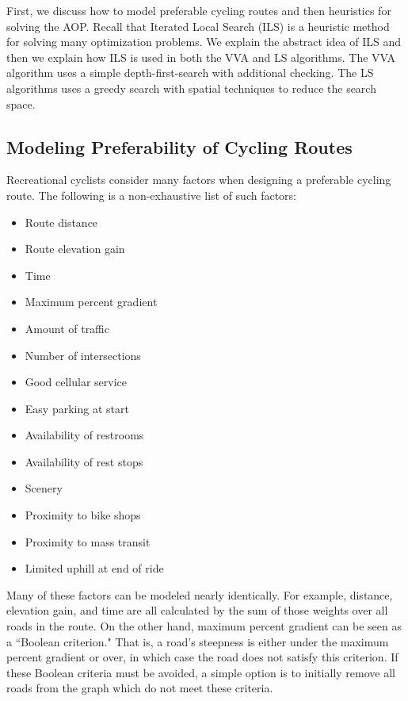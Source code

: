 \documentclass[honors]{union-cs-thesis}
\begin{document}
First, we discuss how to model preferable cycling routes and then heuristics for solving the AOP. Recall that Iterated Local Search (ILS) is a heuristic method for solving many optimization problems. We explain the abstract idea of ILS and then we explain how ILS is used in both the VVA and LS algorithms. The VVA algorithm uses a simple depth-first-search with additional checking. The LS algorithms uses a greedy search with spatial techniques to reduce the search space.

\subsection{Modeling Preferability of Cycling Routes} \label{routefactors}
Recreational cyclists consider many factors when designing a preferable cycling route. The following is a non-exhaustive list of such factors:

\begin{multicols}{3}
\begin{itemize}
    \item Route distance
    \item Route elevation gain
    \item Time
    \item Maximum percent gradient
    \item Amount of traffic
    \item Number of intersections
    \item Good cellular service
    \item Easy parking at start
    \item Availability of restrooms
    \item Availability of rest stops
    \item Scenery
    \item Proximity to bike shops
    \item Proximity to mass transit
    \item Limited uphill at end of ride
\end{itemize}    
\end{multicols}

Many of these factors can be modeled nearly identically. For example, distance, elevation gain, and time are all calculated by the sum of those weights over all roads in the route. On the other hand, maximum percent gradient can be seen as a ``Boolean criterion." That is, a road's steepness is either under the maximum percent gradient or over, in which case the road does not satisfy this criterion. If these Boolean criteria must be avoided, a simple option is to initially remove all roads from the graph which do not meet these criteria.
\end{document}
